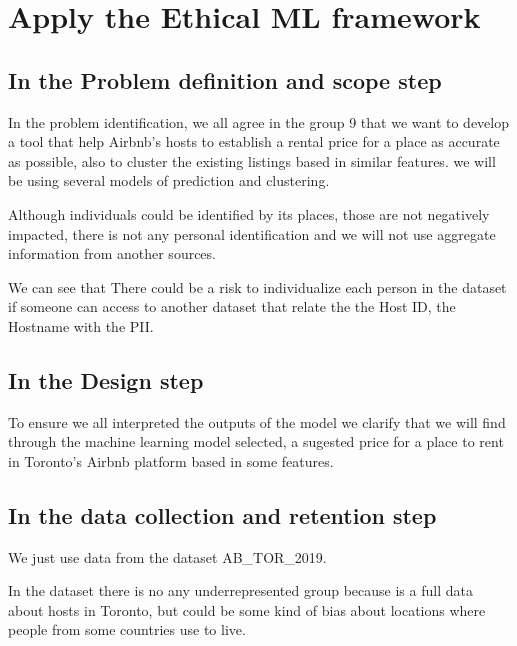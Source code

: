 \hypertarget{apply-the-ethical-ml-framework}{%
\section{Apply the Ethical ML
framework}\label{apply-the-ethical-ml-framework}}

\hypertarget{in-the-problem-definition-and-scope-step}{%
\subsection{In the Problem definition and scope
step}\label{in-the-problem-definition-and-scope-step}}

In the problem identification, we all agree in the group 9 that we want
to develop a tool that help Airbnb's hosts to establish a rental price
for a place as accurate as possible, also to cluster the existing
listings based in similar features. we will be using several models of
prediction and clustering.

Although individuals could be identified by its places, those are not
negatively impacted, there is not any personal identification and we
will not use aggregate information from another sources.

We can see that There could be a risk to individualize each person in
the dataset if someone can access to another dataset that relate the the
Host ID, the Hostname with the PII.

\hypertarget{in-the-design-step}{%
\subsection{In the Design step}\label{in-the-design-step}}

To ensure we all interpreted the outputs of the model we clarify that we
will find through the machine learning model selected, a sugested price
for a place to rent in Toronto's Airbnb platform based in some features.

\hypertarget{in-the-data-collection-and-retention-step}{%
\subsection{In the data collection and retention
step}\label{in-the-data-collection-and-retention-step}}

We just use data from the dataset AB\_TOR\_2019.

In the dataset there is no any underrepresented group because is a full
data about hosts in Toronto, but could be some kind of bias about
locations where people from some countries use to live.


